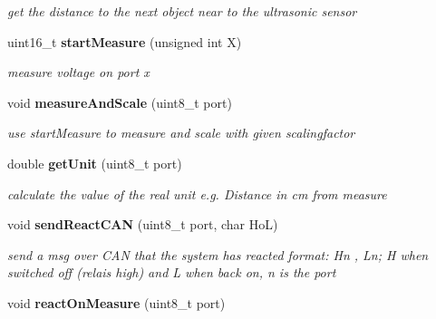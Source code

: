 \begin{DoxyCompactItemize}
\begin{DoxyCompactList}\small\item\em get the distance to the next object near to the ultrasonic sensor \end{DoxyCompactList}\item 
uint16\-\_\-t {\bf start\-Measure} (unsigned int \-X)\label{group__main_ga66087cffe6c68fe543621343e8bcd751}

\begin{DoxyCompactList}\small\item\em measure voltage on port x \end{DoxyCompactList}\item 
void {\bf measure\-And\-Scale} (uint8\-\_\-t port)\label{group__main_ga42a0809c7a977aba4306fadc6d779545}

\begin{DoxyCompactList}\small\item\em use start\-Measure to measure and scale with given scalingfactor \end{DoxyCompactList}\item 
double {\bf get\-Unit} (uint8\-\_\-t port)
\begin{DoxyCompactList}\small\item\em calculate the value of the real unit e.\-g. \-Distance in cm from measure \end{DoxyCompactList}\item 
void {\bf send\-React\-C\-A\-N} (uint8\-\_\-t port, char \-Ho\-L)
\begin{DoxyCompactList}\small\item\em send a msg over \-C\-A\-N that the system has reacted format\-: \-Hn , \-Ln; \-H when switched off (relais high) and \-L when back on, n is the port \end{DoxyCompactList}\item 
void {\bf react\-On\-Measure} (uint8\-\_\-t port)\label{group__main_gad2edb4f30990738fb53001fe0c0f4ee5}


\end{DoxyCompactItemize}
